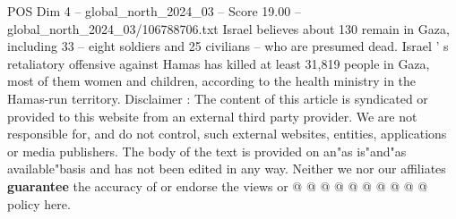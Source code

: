 \begin{textsample}{POS Dim 4 – global\_north\_2024\_03 – Score 19.00 – global\_north\_2024\_03/106788706.txt}
Israel believes about 130 remain in Gaza, including 33 -- eight soldiers and 25 civilians -- who are presumed dead.
Israel ' s retaliatory offensive against Hamas has killed at least 31,819 people in Gaza, most of them women and children, according to the health ministry in the Hamas-run territory.
Disclaimer : The content of this article is syndicated or provided to this website from an external third party provider.
We are not responsible for, and do not control, such external websites, entities, applications or media publishers.
The body of the text is provided on an"as is"and"as available"basis and has not been edited in any way.
Neither we nor our affiliates \textbf{guarantee} the accuracy of or endorse the views or @ @ @ @ @ @ @ @ @ @ policy here.

\end{textsample}
